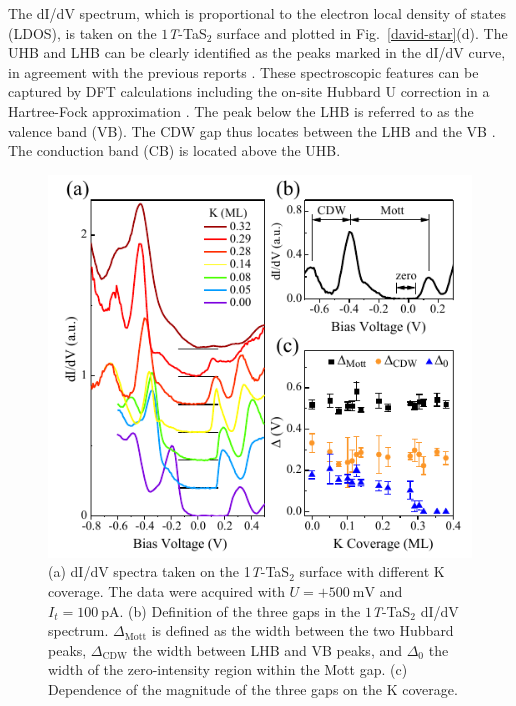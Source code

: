 \documentclass[aps,prl,reprint,groupedaddress,showpacs,amsfonts,amsmath,amssymb,superscriptaddress]{revtex4-1}
\begin{document}
The dI/dV spectrum, which is proportional to the electron local density of states (LDOS), is taken on the $1$\emph{T}-TaS$_{2}$ surface and plotted in Fig.~\ref{david-star}(d). The UHB and LHB can be clearly identified as the peaks marked in the dI/dV curve, in agreement with the previous reports \cite{PhysRevB.92.085132}. These spectroscopic features can be captured by DFT calculations including the on-site Hubbard U correction in a Hartree-Fock approximation \cite{PhysRevB.90.045134}. The peak below the LHB is referred to as the valence band (VB). The CDW gap thus locates between the LHB and the VB \cite{Smith_1985,PhysRevLett.81.1058,RevModPhys.78.17}. The conduction band (CB) is located above the UHB.

\begin{figure}
  \centering
  \includegraphics[scale=1.0]{fig/fig2-r.pdf}
  \caption{\label{coverage-dependence} (a) dI/dV spectra taken on the 1\emph{T}-TaS$_{2}$ surface with different K coverage. The data were acquired with $U=+500~\mathrm{mV}$ and $I_{t}=100~\mathrm{pA}$. (b) Definition of the three gaps in the $1$\emph{T}-TaS$_{2}$ dI/dV spectrum. $\Delta_{\mathrm{Mott}}$ is defined as the width between the two Hubbard peaks, $\Delta_{\mathrm{CDW}}$ the width between LHB and VB peaks, and $\Delta_{\mathrm{0}}$ the width of the zero-intensity region within the Mott gap. (c) Dependence of the magnitude of the three gaps on the K coverage.}
\end{figure}
\end{document}
